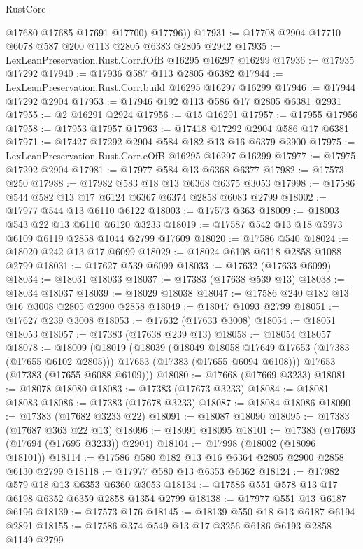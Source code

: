 \begin{lexlean}{RustCore}
\begin{coremodule}
          @17680
          @17685
          @17691
          @17700)
        @17796))
@17931 := @17708 @2904 @17710 @6078 @587 @200 @113 @2805 @6383 @2805 @2942
@17935 := LexLeanPreservation.Rust.Corr.fOfB @16295 @16297 @16299
@17936 := @17935 @17292
@17940 := @17936 @587 @113 @2805 @6382
@17944 := LexLeanPreservation.Rust.Corr.build @16295 @16297 @16299
@17946 := @17944 @17292 @2904
@17953 := @17946 @192 @113 @586 @17 @2805 @6381 @2931
@17955 := @2 @16291 @2924
@17956 := @15 @16291
@17957 := @17955 @17956
@17958 := @17953 @17957
@17963 := @17418 @17292 @2904 @586 @17 @6381
@17971 := @17427 @17292 @2904 @584 @182 @13 @16 @6379 @2900
@17975 := LexLeanPreservation.Rust.Corr.eOfB @16295 @16297 @16299
@17977 := @17975 @17292 @2904
@17981 := @17977 @584 @13 @6368 @6377
@17982 := @17573 @250
@17988 := @17982 @583 @18 @13 @6368 @6375 @3053
@17998 := @17586 @544 @582 @13 @17 @6124 @6367 @6374 @2858 @6083 @2799
@18002 := @17977 @544 @13 @6110 @6122
@18003 := @17573 @363
@18009 := @18003 @543 @22 @13 @6110 @6120 @3233
@18019 := @17587 @542 @13 @18 @5973 @6109 @6119 @2858 @1044 @2799 @17609
@18020 := @17586 @540
@18024 := @18020 @242 @13 @17 @6099
@18029 := @18024 @6108 @6118 @2858 @1088 @2799
@18031 := @17627 @539 @6099
@18033 := @17632 (@17633 @6099)
@18034 := @18031 @18033
@18037 := @17383 (@17638 @539 @13)
@18038 := @18034 @18037
@18039 := @18029 @18038
@18047 := @17586 @240 @182 @13 @16 @3008 @2805 @2900 @2858
@18049 := @18047 @1093 @2799
@18051 := @17627 @239 @3008
@18053 := @17632 (@17633 @3008)
@18054 := @18051 @18053
@18057 := @17383 (@17638 @239 @13)
@18058 := @18054 @18057
@18078 := @18009
    (@18019
      (@18039
        (@18049 @18058 @17649 @17653 (@17383 (@17655 @6102 @2805)))
        @17653
        (@17383 (@17655 @6094 @6108)))
      @17653
      (@17383 (@17655 @6088 @6109)))
@18080 := @17668 (@17669 @3233)
@18081 := @18078 @18080
@18083 := @17383 (@17673 @3233)
@18084 := @18081 @18083
@18086 := @17383 (@17678 @3233)
@18087 := @18084 @18086
@18090 := @17383 (@17682 @3233 @22)
@18091 := @18087 @18090
@18095 := @17383 (@17687 @363 @22 @13)
@18096 := @18091 @18095
@18101 := @17383 (@17693 (@17694 (@17695 @3233)) @2904)
@18104 := @17998 (@18002 (@18096 @18101))
@18114 := @17586 @580 @182 @13 @16 @6364 @2805 @2900 @2858 @6130 @2799
@18118 := @17977 @580 @13 @6353 @6362
@18124 := @17982 @579 @18 @13 @6353 @6360 @3053
@18134 := @17586 @551 @578 @13 @17 @6198 @6352 @6359 @2858 @1354 @2799
@18138 := @17977 @551 @13 @6187 @6196
@18139 := @17573 @176
@18145 := @18139 @550 @18 @13 @6187 @6194 @2891
@18155 := @17586 @374 @549 @13 @17 @3256 @6186 @6193 @2858 @1149 @2799

\end{coremodule}
\end{lexlean}
